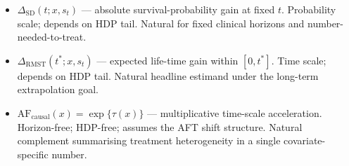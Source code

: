 \documentclass[11pt]{article}
\newcommand{\tauf}{\tau}
\newcommand{\RMST}{\mathrm{RMST}}
\newcommand{\SD}{\mathrm{SD}}
\newcommand{\AF}{\mathrm{AF}}
\begin{document}
\begin{itemize}[leftmargin=*]
  \item $\Delta_{\SD}(t; x, s_{t})$ --- absolute survival-probability
        gain at fixed $t$. Probability scale; depends on HDP tail.
        Natural for fixed clinical horizons and number-needed-to-treat.
  \item $\Delta_{\RMST}(t^{*}; x, s_{t})$ --- expected life-time gain
        within $[0, t^{*}]$. Time scale; depends on HDP tail.
        Natural headline estimand under the long-term extrapolation goal.
  \item $\AF_{\mathrm{causal}}(x) = \exp\{\tauf(x)\}$ --- multiplicative
        time-scale acceleration. Horizon-free; HDP-free; assumes
        the AFT shift structure. Natural complement summarising treatment
        heterogeneity in a single covariate-specific number.
\end{itemize}
\end{document}
